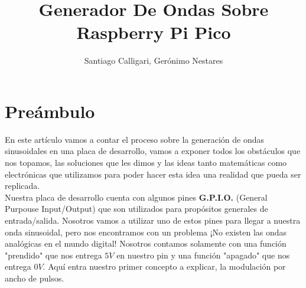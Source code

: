 \documentclass[]{article}
\title{Generador De Ondas Sobre Raspberry Pi Pico}
\author{Santiago Calligari, Gerónimo Nestares}
\begin{document}
\maketitle

\section*{Preámbulo}
En este artículo vamos a contar el proceso sobre la generación de ondas sinusoidales en una placa de desarrollo, vamos a exponer todos los obstáculos que nos topamos, las soluciones que les dimos y las ideas tanto matemáticas como electrónicas que utilizamos para poder hacer esta idea una realidad que pueda ser replicada.\\
Nuestra placa de desarrollo cuenta con algunos pines \textbf{G.P.I.O.} (General Purpouse Input/Output) que son utilizados para propósitos generales de entrada/salida. Nosotros vamos a utilizar uno de estos pines para llegar a nuestra onda sinusoidal, pero nos encontramos con un problema ¡No existen las ondas analógicas en el mundo digital! Nosotros contamos solamente con una función "prendido" que nos entrega $5V$ en nuestro pin y una función "apagado" que nos entrega $0V$. Aquí entra nuestro primer concepto a explicar, la modulación por ancho de pulsos.
\end{document}
